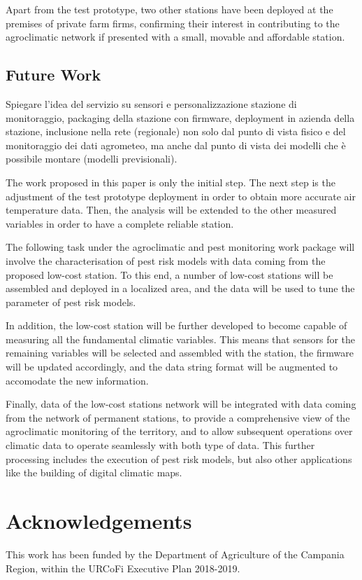 \documentclass[authoryear,preprint,review,12pt]{elsarticle}
\begin{document}
Apart from the test prototype, two other stations have been deployed at the premises of private farm firms, confirming their interest in contributing to the agroclimatic network if presented with a small, movable and affordable station.

\subsection{Future Work}
Spiegare l'idea del servizio su sensori e personalizzazione stazione di monitoraggio, packaging della stazione con firmware, deployment in azienda della stazione, inclusione nella rete (regionale) non solo dal punto di vista fisico e del monitoraggio dei dati agrometeo, ma anche dal punto di vista dei modelli che è possibile montare (modelli previsionali).

The work proposed in this paper is only the initial step. The next step is the adjustment of the test prototype deployment in order to obtain more accurate air temperature data. Then, the analysis will be extended to the other measured variables in order to have a complete reliable station.

The following task under the agroclimatic and pest monitoring work package will involve the characterisation of pest risk models with data coming from the proposed low-cost station. To this end, a number of low-cost stations will be assembled and deployed in a localized area, and the data will be used to tune the parameter of pest risk models.

In addition, the low-cost station will be further developed to become capable of measuring all the fundamental climatic variables. 
This means that sensors for the remaining variables will be selected and assembled with the station, the firmware will be updated accordingly, and the data string format will be augmented to accomodate the new information.

Finally, data of the low-cost stations network will be integrated with data coming from the network of permanent stations, to provide a comprehensive view of the agroclimatic monitoring of the territory, and to allow subsequent operations over climatic data to operate seamlessly with both type of data. This further processing includes the execution of pest risk models, but also other applications like the building of digital climatic maps.

\section*{Acknowledgements}
This work has been funded by the Department of Agriculture of the Campania Region, within the URCoFi Executive Plan 2018-2019.

   
  
\end{document}
